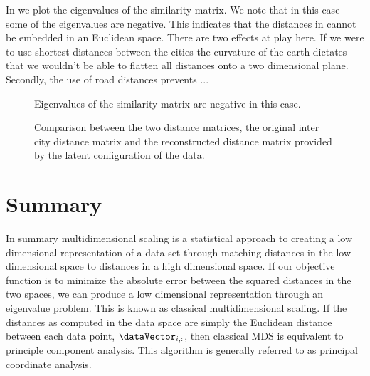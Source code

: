 In  we plot the eigenvalues of the
similarity matrix. We note that in this case some of the eigenvalues
are negative. This indicates that the distances in 
cannot be embedded in an Euclidean space. There are two effects at
play here. If we were to use shortest distances between the cities the
curvature of the earth dictates that we wouldn't be able to flatten
all distances onto a two dimensional plane. Secondly, the use of road
distances prevents ...
% 
\begin{figure}
  \begin{center}
    
  \end{center}

  \caption{Eigenvalues of the similarity matrix are negative in this
    case.}\label{fig:roadEigenvalues}

\end{figure}


% 
\begin{figure}
  \hfill

  \caption{Comparison between the two distance matrices, the original
    inter city distance matrix and the reconstructed distance matrix
    provided by the latent configuration of the data.}

\end{figure}

\section{Summary}

In summary multidimensional scaling is a statistical approach to creating a low dimensional
representation of a data set through matching distances in the low
dimensional space to distances in a high dimensional space. If our
objective function is to minimize the absolute error between the
squared distances in the two spaces, we can produce a low dimensional
representation through an eigenvalue problem. This is known as
classical multidimensional scaling. If the
distances as computed in the data space are simply the Euclidean
distance between each data point, $\dataVector_{i,:}$, then classical
MDS is equivalent to principle component analysis. This algorithm is generally referred to
as principal coordinate analysis.

